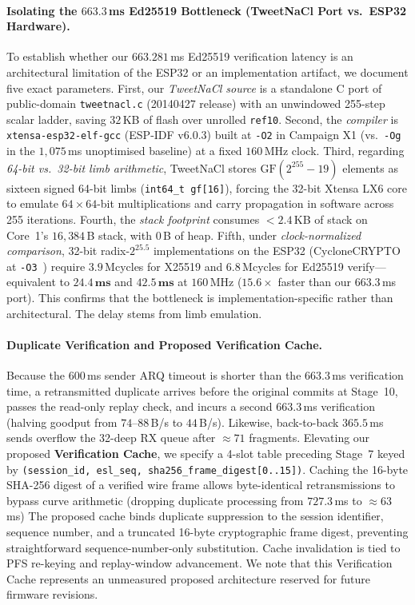 \documentclass[conference]{IEEEtran}
\begin{document}
\paragraph{Isolating the $663.3$\,ms Ed25519 Bottleneck (TweetNaCl Port vs.\ ESP32 Hardware).}\label{sec:vc} To establish whether our $663.281$\,ms Ed25519 verification latency is an architectural limitation of the ESP32 or an implementation artifact, we document five exact parameters. First, our \textit{TweetNaCl source} is a standalone C port of public-domain \texttt{tweetnacl.c} (20140427 release) with an unwindowed 255-step scalar ladder, saving $32$\,KB of flash over unrolled \texttt{ref10}. Second, the \textit{compiler} is \texttt{xtensa-esp32-elf-gcc} (ESP-IDF v6.0.3) built at \texttt{-O2} in Campaign X1 (vs.\ \texttt{-Og} in the $1{,}075$\,ms unoptimised baseline) at a fixed $160$\,MHz clock. Third, regarding \textit{64-bit vs.\ 32-bit limb arithmetic}, TweetNaCl stores $\text{GF}(2^{255}-19)$ elements as sixteen signed 64-bit limbs (\texttt{int64\_t gf[16]}), forcing the 32-bit Xtensa LX6 core to emulate $64\times 64$-bit multiplications and carry propagation in software across 255 iterations. Fourth, the \textit{stack footprint} consumes $<2.4$\,KB of stack on Core~1's $16{,}384$\,B stack, with $0$\,B of heap. Fifth, under \textit{clock-normalized comparison}, 32-bit radix-$2^{25.5}$ implementations on the ESP32 (CycloneCRYPTO at \texttt{-O3}~\cite{oryx_esp32}) require $3.9$\,Mcycles for X25519 and $6.8$\,Mcycles for Ed25519 verify---equivalent to $\mathbf{24.4\,\textbf{ms}}$ and $\mathbf{42.5\,\textbf{ms}}$ at $160$\,MHz ($15.6\times$ faster than our $663.3$\,ms port). This confirms that the bottleneck is implementation-specific rather than architectural. The delay stems from limb emulation.

\paragraph{Duplicate Verification and Proposed Verification Cache.} Because the $600$\,ms sender ARQ timeout is shorter than the $663.3$\,ms verification time, a retransmitted duplicate arrives before the original commits at Stage~10, passes the read-only replay check, and incurs a second $663.3$\,ms verification (halving goodput from $74$--$88$\,B/s to $44$\,B/s). Likewise, back-to-back $365.5$\,ms sends overflow the 32-deep RX queue after $\approx 71$ fragments. Elevating our proposed \textbf{Verification Cache}, we specify a 4-slot table preceding Stage~7 keyed by \texttt{(session\_id, esl\_seq, sha256\_frame\_digest[0..15])}. Caching the 16-byte SHA-256 digest of a verified wire frame allows byte-identical retransmissions to bypass curve arithmetic (dropping duplicate processing from $727.3$\,ms to $\approx 63$\,ms) The proposed cache binds duplicate suppression to the session identifier, sequence number, and a truncated 16-byte cryptographic frame digest, preventing straightforward sequence-number-only substitution. Cache invalidation is tied to PFS re-keying and replay-window advancement. We note that this Verification Cache represents an unmeasured proposed architecture reserved for future firmware revisions.
\end{document}

